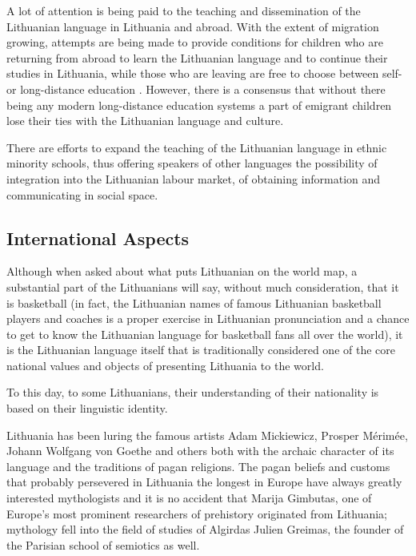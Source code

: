 \begin{multicols}{2}
A lot of attention is being paid to the teaching and dissemination of the Lithuanian language in Lithuania and abroad. With the extent of migration growing, attempts are being made to provide conditions for children who are returning from abroad to learn the Lithuanian language and to continue their studies in Lithuania, while those who are leaving are free to choose between self- or long-distance education \cite{smm5}.  However, there is a consensus that without there being any modern long-distance education systems a part of emigrant children lose their ties with the Lithuanian language and culture.

There are efforts to expand the teaching of the Lithuanian language in ethnic minority schools, thus offering speakers of other languages the possibility of integration into the Lithuanian labour market, of obtaining information and communicating in social space.

\subsection{International Aspects}

Although when asked about what puts Lithuanian on the world map, a substantial part of the Lithuanians will say, without much consideration, that it is basketball (in fact, the Lithuanian names of famous Lithuanian basketball players and coaches is a proper exercise in Lithuanian pronunciation and a chance to get to know the Lithuanian language for basketball fans all over the world), it is the Lithuanian language itself that is traditionally considered one of the core national values and objects of presenting Lithuania to the world.

    To this day, to some Lithuanians, their understanding of their nationality is based on their linguistic identity.


Lithuania has been luring the famous artists Adam Mickiewicz, Prosper Mérimée, Johann Wolfgang von Goethe and others both with the archaic character of its language and the traditions of pagan religions. The pagan beliefs and customs that probably persevered in Lithuania the longest in Europe have always greatly interested mythologists and it is no accident  that Marija Gimbutas, one of Europe’s most prominent researchers of  prehistory originated from Lithuania; mythology fell into the field of studies of Algirdas Julien Greimas, the founder of the Parisian school of semiotics as well.


\end{multicols}
